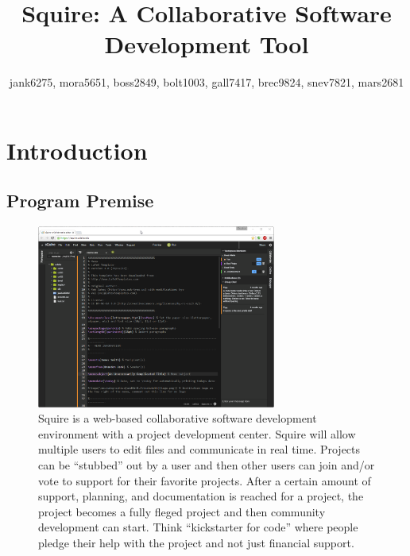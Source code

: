\documentclass[11pt]{report}
\title{Squire: A Collaborative Software Development Tool}
\author{jank6275, mora5651, boss2849, bolt1003, gall7417, brec9824, snev7821, mars2681}
\begin{document}
\maketitle

\tableofcontents

\chapter{Introduction}

\section{Program Premise}
    \begin{figure}
      \begin{center}
        \includegraphics[width=0.7\textwidth]{squire}
      \end{center}
      \caption{Squire is a web-based collaborative software development environment with a project development center. Squire will allow multiple users to edit files and communicate in real time. Projects can be ``stubbed'' out by a user and then other users can join and/or vote to support for their favorite projects. After a certain amount of support, planning, and documentation is reached for a project, the project becomes a fully fleged project and then community development can start. Think ``kickstarter for code'' where people pledge their help with the project and not just financial support.}
    \end{figure}
\end{document}

